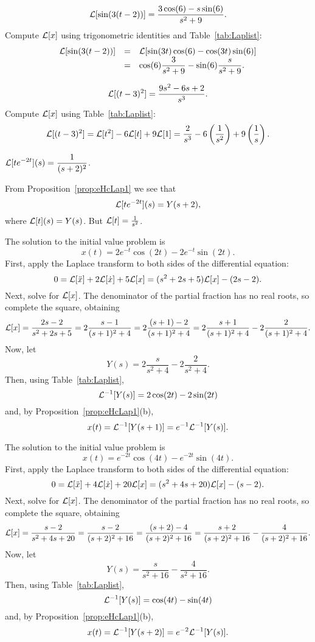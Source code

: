  \ans
\[
{\cal L}[\sin(3(t - 2))] = 
\frac{3\cos(6) - s\sin(6)}{s^2 + 9}.
\]
\soln Compute ${\cal L}[x]$ using trigonometric identities and
Table~\ref{tab:Laplist}:
\[
\begin{array}{rcl}
{\cal L}[\sin(3(t - 2))]
& = & {\cal L}[\sin(3t)\cos(6) - \cos(3t)\sin(6)] \\
& = & \displaystyle \cos(6)\frac{3}{s^2 + 9} - \sin(6)\frac{s}{s^2 + 9}.
\end{array}
\]

 \ans
\[
{\cal L}[(t - 3)^2] = \frac{9s^2 - 6s + 2}{s^3}.
\]
\soln Compute ${\cal L}[x]$ using Table~\ref{tab:Laplist}:
\[
{\cal L}[(t - 3)^2] = {\cal L}[t^2] - 6{\cal L}[t] + 9{\cal L}[1]
= \frac{2}{s^3} - 6\left(\frac{1}{s^2}\right) + 9\left(\frac{1}{s}
\right).
\]


 \ans $\displaystyle {\cal L}[te^{-2t}](s)=\frac{1}{(s+2)^2}$.

\soln  From Proposition~\ref{prop:eHcLap1} we see that
\[
{\cal L}[te^{-2t}](s) = Y(s+2),
\]
where ${\cal L}[t](s) = Y(s)$.  But ${\cal L}[t] = \frac{1}{s^2}$.

 \ans The solution to the initial value problem is
\[
x(t) = 2e^{-t}\cos(2t) - 2e^{-t}\sin(2t).
\]
\soln First, apply the Laplace transform to both sides of the differential
equation:
\[
0 = {\cal L}[\ddot{x}] + 2{\cal L}[\dot{x}] + 5{\cal L}[x]
= (s^2 + 2s + 5){\cal L}[x] - (2s - 2).
\]
Next, solve for ${\cal L}[x]$.  The denominator of the partial fraction
has no real roots, so complete the square, obtaining
\[
{\cal L}[x]
= \frac{2s - 2}{s^2 + 2s + 5}
= 2\frac{s - 1}{(s + 1)^2 + 4}
= 2\frac{(s + 1) - 2}{(s + 1)^2 + 4}
= 2\frac{s + 1}{(s + 1)^2 + 4} - 2\frac{2}{(s + 1)^2 + 4}.
\]
Now, let
\[
Y(s) = 2\frac{s}{s^2 + 4} - 2\frac{2}{s^2 + 4}.
\]
Then, using Table~\ref{tab:Laplist},
\[
{\cal L}^{-1}[Y(s)] = 2\cos(2t) - 2\sin(2t)
\]
and, by Proposition~\ref{prop:eHcLap1}(b),
\[
x(t) = {\cal L}^{-1}[Y(s + 1)] = e^{-1}{\cal L}^{-1}[Y(s)].
\]


 \ans The solution to the initial value problem is
\[
x(t) = e^{-2t}\cos(4t) - e^{-2t}\sin(4t).
\]
\soln First, apply the Laplace transform to both sides of the differential
equation:
\[
0 = {\cal L}[\ddot{x}] + 4{\cal L}[\dot{x}] + 20{\cal L}[x]
= (s^2 + 4s + 20){\cal L}[x] - (s - 2).
\]
Next, solve for ${\cal L}[x]$.  The denominator of the partial fraction
has no real roots, so complete the square, obtaining
\[
{\cal L}[x]
= \frac{s - 2}{s^2 + 4s + 20}
= \frac{s - 2}{(s + 2)^2 + 16}
= \frac{(s + 2) - 4}{(s + 2)^2 + 16}
= \frac{s + 2}{(s + 2)^2 + 16} - \frac{4}{(s + 2)^2 + 16}.
\]
Now, let
\[
Y(s) = \frac{s}{s^2 + 16} - \frac{4}{s^2 + 16}.
\]
Then, using Table~\ref{tab:Laplist},
\[
{\cal L}^{-1}[Y(s)] = \cos(4t) - \sin(4t)
\]
and, by Proposition~\ref{prop:eHcLap1}(b),
\[
x(t) = {\cal L}^{-1}[Y(s + 2)] = e^{-2}{\cal L}^{-1}[Y(s)].
\]


